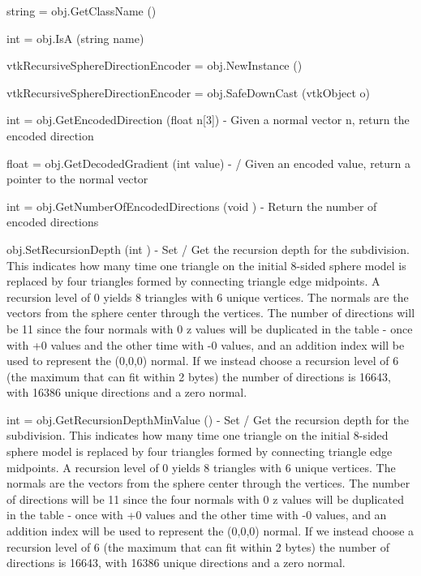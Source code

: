 \begin{DoxyItemize}
\item {\ttfamily string = obj.\-Get\-Class\-Name ()}  
\item {\ttfamily int = obj.\-Is\-A (string name)}  
\item {\ttfamily vtk\-Recursive\-Sphere\-Direction\-Encoder = obj.\-New\-Instance ()}  
\item {\ttfamily vtk\-Recursive\-Sphere\-Direction\-Encoder = obj.\-Safe\-Down\-Cast (vtk\-Object o)}  
\item {\ttfamily int = obj.\-Get\-Encoded\-Direction (float n\mbox{[}3\mbox{]})} -\/ Given a normal vector n, return the encoded direction  
\item {\ttfamily float = obj.\-Get\-Decoded\-Gradient (int value)} -\/ / Given an encoded value, return a pointer to the normal vector  
\item {\ttfamily int = obj.\-Get\-Number\-Of\-Encoded\-Directions (void )} -\/ Return the number of encoded directions  
\item {\ttfamily obj.\-Set\-Recursion\-Depth (int )} -\/ Set / Get the recursion depth for the subdivision. This indicates how many time one triangle on the initial 8-\/sided sphere model is replaced by four triangles formed by connecting triangle edge midpoints. A recursion level of 0 yields 8 triangles with 6 unique vertices. The normals are the vectors from the sphere center through the vertices. The number of directions will be 11 since the four normals with 0 z values will be duplicated in the table -\/ once with +0 values and the other time with -\/0 values, and an addition index will be used to represent the (0,0,0) normal. If we instead choose a recursion level of 6 (the maximum that can fit within 2 bytes) the number of directions is 16643, with 16386 unique directions and a zero normal.  
\item {\ttfamily int = obj.\-Get\-Recursion\-Depth\-Min\-Value ()} -\/ Set / Get the recursion depth for the subdivision. This indicates how many time one triangle on the initial 8-\/sided sphere model is replaced by four triangles formed by connecting triangle edge midpoints. A recursion level of 0 yields 8 triangles with 6 unique vertices. The normals are the vectors from the sphere center through the vertices. The number of directions will be 11 since the four normals with 0 z values will be duplicated in the table -\/ once with +0 values and the other time with -\/0 values, and an addition index will be used to represent the (0,0,0) normal. If we instead choose a recursion level of 6 (the maximum that can fit within 2 bytes) the number of directions is 16643, with 16386 unique directions and a zero normal.  

\end{DoxyItemize}
